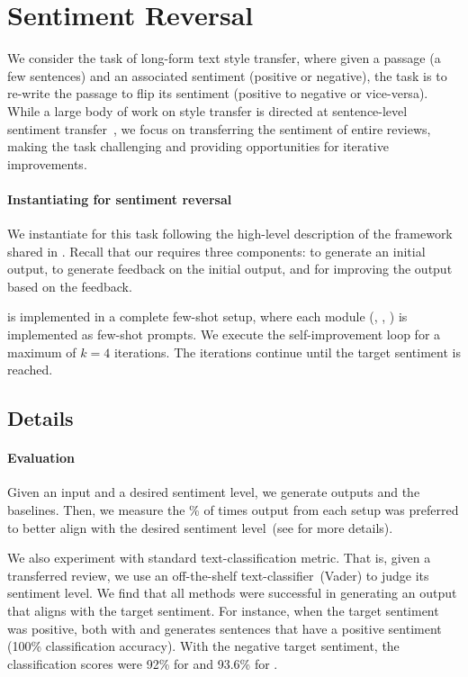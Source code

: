 \section{Sentiment Reversal}
\label{section:sentiment}




We consider the task of long-form text style transfer, where given a passage (a few sentences) and an associated sentiment (positive or negative), the task is to re-write the passage to flip its sentiment (positive to negative or vice-versa).
While a large body of work on style transfer is directed at sentence-level sentiment transfer~\citep{li-etal-2018-delete,prabhumoye-etal-2018-style}, we focus on transferring the sentiment of entire reviews, making the task challenging and providing opportunities for iterative improvements.


\paragraph{Instantiating \ours for sentiment reversal}
We instantiate \ours for this task following the high-level description of the framework shared in .
Recall that our requires three components: \initmod to generate an initial output, \fbmod to generate feedback on the initial output, and \itermod for improving the output based on the feedback.


\ours is implemented in a complete few-shot setup, where each module (\init, \fb, \iter) is implemented as few-shot prompts.
We execute the self-improvement loop for a maximum of $k=4$ iterations.
The iterations continue until the target sentiment is reached.



\subsection{Details}


\paragraph{Evaluation} 
Given an input and a desired sentiment level, we generate outputs \ours and the baselines.
Then, we measure the \% of times output from each setup was preferred to better align with the desired sentiment level~(see  for more details).



We also experiment with standard text-classification metric. 
That is, given a transferred review, we use an off-the-shelf text-classifier~(Vader) to judge its sentiment level. 
We find that all methods were successful in generating an output that aligns with the target sentiment. 
For instance, when the target sentiment was positive, both \direct with \gptlatest and \ours generates sentences that have a positive sentiment (100\% classification accuracy). 
With the negative target sentiment, the classification scores were 92\% for \direct and 93.6\% for \ours. 

